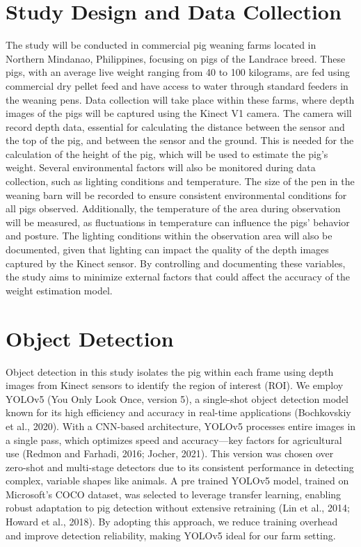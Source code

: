 {\section{Study Design and Data Collection}
The study will be conducted in commercial pig weaning farms located in Northern Mindanao, Philippines, focusing on pigs of the Landrace breed. These pigs, with an average live weight ranging from 40 to 100 kilograms, are fed using commercial dry pellet feed and have access to water through standard feeders in the weaning pens. Data collection will take place within these farms, where depth images of the pigs will be captured using the Kinect V1 camera. The camera will record depth data, essential for calculating the distance between the sensor and the top of the pig, and between the sensor and the ground. This is needed for the calculation of the height of the pig, which will be used to estimate the pig's weight.
Several environmental factors will also be monitored during data collection, such as lighting conditions and temperature. The size of the pen in the weaning barn will be recorded to ensure consistent environmental conditions for all pigs observed. Additionally, the temperature of the area during observation will be measured, as fluctuations in temperature can influence the pigs’ behavior and posture. The lighting conditions within the observation area will also be documented, given that lighting can impact the quality of the depth images captured by the Kinect sensor. By controlling and documenting these variables, the study aims to minimize external factors that could affect the accuracy of the weight estimation model.

\section{Object Detection}
Object detection in this study isolates the pig within each frame using depth images from Kinect sensors to identify the region of interest (ROI). We employ YOLOv5 (You Only Look Once, version 5), a single-shot object detection model known for its high efficiency and accuracy in real-time applications (Bochkovskiy et al., 2020). With a CNN-based architecture, YOLOv5 processes entire images in a single pass, which optimizes speed and accuracy—key factors for agricultural use (Redmon and Farhadi, 2016; Jocher, 2021). This version was chosen over zero-shot and multi-stage detectors due to its consistent performance in detecting complex, variable shapes like animals. A pre trained YOLOv5 model, trained on Microsoft’s COCO dataset, was selected to leverage transfer learning, enabling robust adaptation to pig detection without extensive retraining (Lin et al., 2014; Howard et al., 2018). By adopting this approach, we reduce training overhead and improve detection reliability, making YOLOv5 ideal for our farm setting.

}
